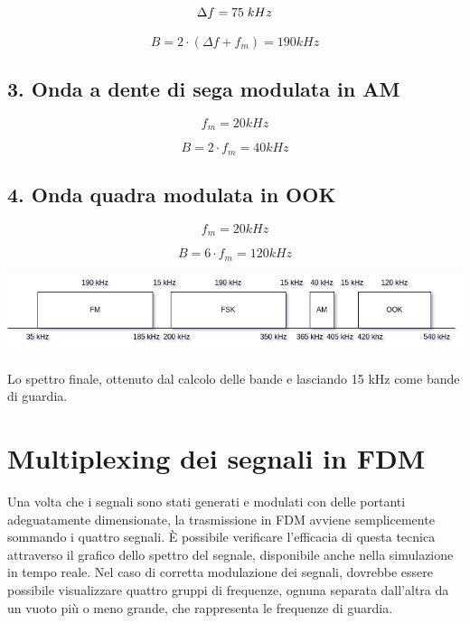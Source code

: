 \documentclass{article}
\begin{document}
\begin{equation}
    \Delta f = 75 \hspace{0.1cm} kHz
\end{equation}

\begin{equation}
    B = 2 \cdot (\Delta f + f_m) = 190 kHz
\end{equation}

\subsection{3. Onda a dente di sega modulata in AM}
\begin{equation}
    f_m = 20 kHz
\end{equation}

\begin{equation}
    B = 2 \cdot f_m = 40 kHz
\end{equation}

\subsection{4. Onda quadra modulata in OOK}
\begin{equation}
    f_m = 20 kHz
\end{equation}

\begin{equation}
    B = 6 \cdot f_m = 120 kHz
\end{equation}

\begin{center}
    \includegraphics[width=\textwidth]{bandwidth.png}
\end{center}
Lo spettro finale, ottenuto dal calcolo delle bande e lasciando 15 kHz come bande di guardia.

\section{Multiplexing dei segnali in FDM}
Una volta che i segnali sono stati generati e modulati con delle portanti adeguatamente dimensionate, la trasmissione in FDM
avviene semplicemente sommando i quattro segnali. È possibile verificare l'efficacia di questa tecnica attraverso il grafico
dello spettro del segnale, disponibile anche nella simulazione in tempo reale. Nel caso di corretta modulazione dei segnali,
dovrebbe essere possibile visualizzare quattro gruppi di frequenze, ognuna separata dall'altra da un vuoto più o meno grande,
che rappresenta le frequenze di guardia.
\end{document}
